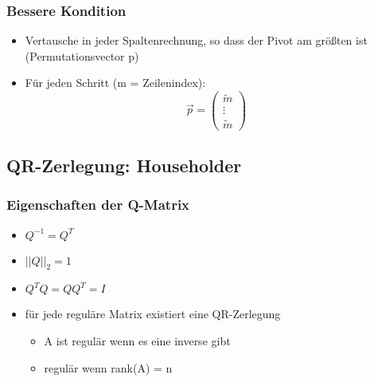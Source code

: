 \subsubsection*{Bessere Kondition}
\begin{itemize}

	\item Vertausche in jeder Spaltenrechnung, so dass der Pivot am größten ist (Permutationsvector p)
	
	\item Für jeden Schritt (m = Zeilenindex):
		\begin{displaymath}
			\vec{p} =
			\begin{pmatrix}
				\widetilde{m} \\
				\vdots \\
				\widetilde{m}
			\end{pmatrix}
		\end{displaymath}

\end{itemize}

\subsection{QR-Zerlegung: Householder}

\subsubsection*{Eigenschaften der Q-Matrix}
\begin{itemize}

	\item $Q^{-1} = Q^T$
	
	\item $||Q||_2 = 1$
	
	\item $Q^TQ = QQ^T = I$
	
	\item für jede reguläre Matrix existiert eine QR-Zerlegung
	\begin{itemize}
	
		\item A ist regulär wenn es eine inverse gibt
		
		\item regulär wenn rank(A) = n	
	
	\end{itemize}
	
\end{itemize}

\pagebreak
